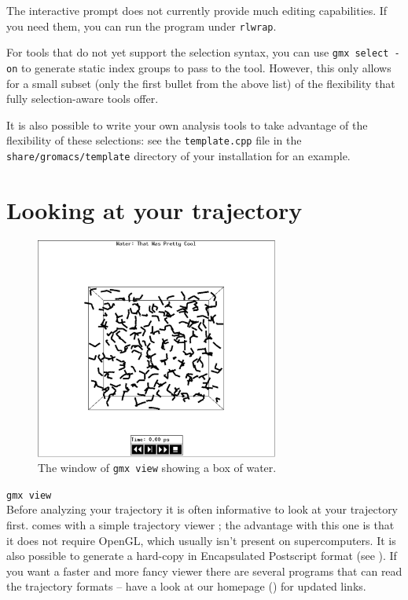 The interactive prompt does not currently provide much editing
capabilities.  If you need them, you can run the program under
{\tt rlwrap}.

For tools that do not yet support the selection syntax, you can use
{\tt gmx select -on} to generate static index groups to pass to the
tool.  However, this only allows for a small subset (only the first
bullet from the above list) of the flexibility that fully
selection-aware tools offer.

It is also possible to write your own analysis
tools to take advantage of the flexibility of these selections: see the
{\tt template.cpp} file in the {\tt share/gromacs/template} directory of
your installation for an example.


\section{Looking at your trajectory}
\label{sec:lookwhostalking}
\begin{figure}
\centerline{
{\includegraphics[width=8cm,angle=90]{plots/ngmxdump}}}
\caption{The window of {\tt gmx view} showing a box of water.}
\label{fig:ngmxdump}
\end{figure}
{\tt gmx view}\\
Before analyzing your trajectory it is often informative to look at
your trajectory first. {\gromacs} comes with a simple trajectory
viewer {\tt {}}; the advantage with this one is that it does not
require OpenGL, which usually isn't present on {\eg} supercomputers.
It is also possible to generate a
hard-copy in Encapsulated Postscript format (see
). If you want a faster and more fancy viewer
 there are several programs
that can read the {\gromacs} trajectory formats -- have a look at our
homepage ({\wwwpage}) for updated links. 

